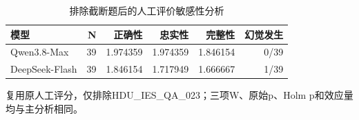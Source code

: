 \begin{table}[htbp]
\centering\footnotesize
\setlength{\tabcolsep}{4pt}
\caption{排除截断题后的人工评价敏感性分析}
\label{tab:cm-common}
\begin{tabular}{lrrrrr}
\toprule
模型 & N & 正确性 & 忠实性 & 完整性 & 幻觉发生 \\
\midrule
Qwen3.8-Max & 39 & 1.974359 & 1.974359 & 1.846154 & 0/39 \\
DeepSeek-Flash & 39 & 1.846154 & 1.717949 & 1.666667 & 1/39 \\
\bottomrule
\end{tabular}
\par\smallskip\raggedright 复用原人工评分，仅排除HDU\_IES\_QA\_023；三项W、原始p、Holm p和效应量均与主分析相同。
\end{table}
